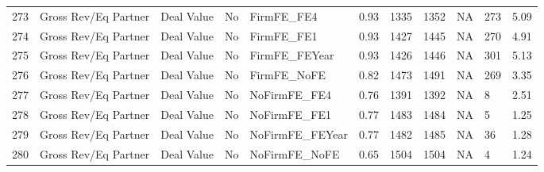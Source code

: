 \begin{table}[ht]
\begin{tabular}{rllllllllll}
  273 & Gross Rev/Eq Partner & Deal Value & No & FirmFE\_FE4 & 0.93 & 1335 & 1352 & NA & 273 & 5.09 \\ 
  274 & Gross Rev/Eq Partner & Deal Value & No & FirmFE\_FE1 & 0.93 & 1427 & 1445 & NA & 270 & 4.91 \\ 
  275 & Gross Rev/Eq Partner & Deal Value & No & FirmFE\_FEYear & 0.93 & 1426 & 1446 & NA & 301 & 5.13 \\ 
  276 & Gross Rev/Eq Partner & Deal Value & No & FirmFE\_NoFE & 0.82 & 1473 & 1491 & NA & 269 & 3.35 \\ 
  277 & Gross Rev/Eq Partner & Deal Value & No & NoFirmFE\_FE4 & 0.76 & 1391 & 1392 & NA & 8 & 2.51 \\ 
  278 & Gross Rev/Eq Partner & Deal Value & No & NoFirmFE\_FE1 & 0.77 & 1483 & 1484 & NA & 5 & 1.25 \\ 
  279 & Gross Rev/Eq Partner & Deal Value & No & NoFirmFE\_FEYear & 0.77 & 1482 & 1485 & NA & 36 & 1.28 \\ 
  280 & Gross Rev/Eq Partner & Deal Value & No & NoFirmFE\_NoFE & 0.65 & 1504 & 1504 & NA & 4 & 1.24 \\ 
   \hline
\end{tabular}
\end{table}

